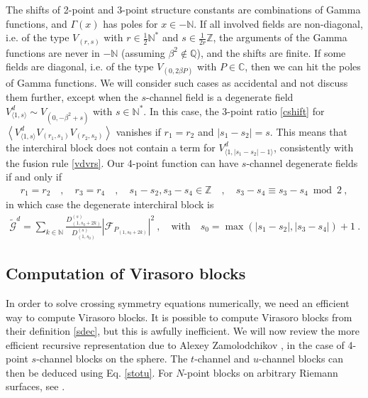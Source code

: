 \documentclass[12pt, a4paper]{article}
\begin{document}
The shifts of 2-point and 3-point structure constants are combinations of Gamma functions, and $\Gamma(x)$ has poles for $x\in -\mathbb{N}$.
If all involved fields are non-diagonal, i.e. of the type $V_{(r,s)}$ with $r\in\frac12\mathbb{N}^*$ and $s\in\frac{1}{2r}\mathbb{Z}$, the arguments of the Gamma functions are never in $-\mathbb{N}$ (assuming $\beta^2\notin \mathbb{Q}$), and the shifts are finite. If some fields are diagonal, i.e. of the type $V_{(0,2\beta P)}$ with $P\in \mathbb{C}$, then we can hit the poles of Gamma functions. We will consider such cases as accidental and not discuss them further, except when the $s$-channel field is a degenerate field $V^d_{\langle 1,s\rangle}\sim V_{(0,-\beta^2+s)}$ with $s\in\mathbb{N}^*$. 
In this case, the 3-point ratio \eqref{cshift} for $\left<V^d_{\langle 1,s\rangle}V_{(r_1,s_1)}V_{(r_2,s_2)}\right>$ vanishes if $r_1=r_2$ and $|s_1-s_2|=s$. This means that the interchiral block does not contain a term for $V^d_{\langle 1,|s_1-s_2|-1\rangle}$, consistently with the fusion rule \eqref{vdvrs}. Our 4-point function can have $s$-channel degenerate fields if and only if 
\begin{align}
 r_1=r_2 \quad , \quad r_3=r_4 \quad , \quad s_1-s_2,s_3-s_4\in \mathbb{Z} \quad , \quad s_3-s_4\equiv s_3-s_4\bmod 2\ , 
\end{align}
in which case the degenerate interchiral block is 
\begin{align}
 \boxed{\widetilde{\mathcal{G}}^d = \sum_{k\in \mathbb{N}} \frac{D^{(s)}_{(1,s_0+2k)}}{D^{(s)}_{(1,s_0)}}\left| \mathcal{F}_{P_{(1,s_0+2k)}} \right|^2\ ,  \quad \text{with} \quad s_0 =  \max(|s_1-s_2|,|s_3-s_4|)+1}\ . 
\end{align}

\subsection{Computation of Virasoro blocks}

In order to solve crossing symmetry equations numerically, we need an efficient way to compute Virasoro blocks. It is possible to compute Virasoro blocks from their definition \eqref{sdec}, but this is awfully inefficient. We will now review the more efficient recursive representation due to Alexey Zamolodchikov \cite{zam87b}, in the case of 4-point $s$-channel blocks on the sphere. The $t$-channel and $u$-channel blocks can then be deduced using Eq. \eqref{stotu}. For $N$-point blocks on arbitrary Riemann surfaces, see \cite{ccy17}.
\end{document}
